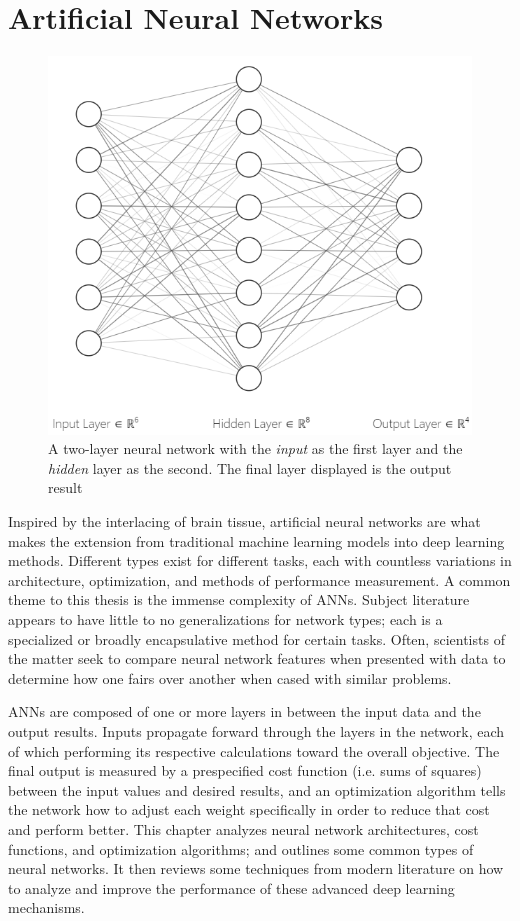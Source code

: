 \chapter{Artificial Neural Networks}

\begin{figure}
  \vspace{-20pt}
    \centering
    \includegraphics[width=.37\textwidth]{Figures/NN_int.png}
    \caption{\footnotesize{A two-layer neural network with the \emph{input} as the first layer and the \emph{hidden} layer as the second.  The final layer displayed is the output result}}
  \label{NNet}
  \vspace{-17pt}
\end{figure}


Inspired by the interlacing of brain tissue, artificial neural networks are what makes the extension from traditional machine learning models into deep learning methods.  Different types exist for different tasks, each with countless variations in architecture, optimization, and methods of performance measurement. A common theme to this thesis is the immense complexity of ANNs. Subject literature appears to have little to no generalizations for network types; each is a specialized or broadly encapsulative method for certain tasks.  Often, scientists of the matter seek to compare neural network features when presented with data to determine how one fairs over another when cased with similar problems. \cite{nusrat2018comparison} \cite{sharma2017activation} \cite{8371683}

ANNs are composed of one or more layers in between the input data and the output results.  Inputs propagate forward through the layers in the network, each of which performing its respective calculations toward the overall objective.  The final output is measured by a prespecified cost function (i.e. sums of squares) between the input values and desired results, and an optimization algorithm tells the network how to adjust each weight specifically in order to reduce that cost and perform better.  This chapter analyzes neural network architectures, cost functions, and  optimization algorithms; and outlines some common types of neural networks. It then reviews some techniques from modern literature on how to analyze and improve the performance of these advanced deep learning mechanisms.



